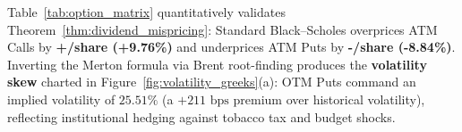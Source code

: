Table~\ref{tab:option_matrix} quantitatively validates Theorem~\ref{thm:dividend_mispricing}: Standard Black--Scholes overprices ATM Calls by \textbf{+/share (+9.76\%)} and underprices ATM Puts by \textbf{-/share (-8.84\%)}. Inverting the Merton formula via Brent root-finding produces the \textbf{volatility skew} charted in Figure~\ref{fig:volatility_greeks}(a): OTM Puts command an implied volatility of \textbf{$25.51\%$} (a $+211\text{ bps}$ premium over historical volatility), reflecting institutional hedging against tobacco tax and budget shocks.
